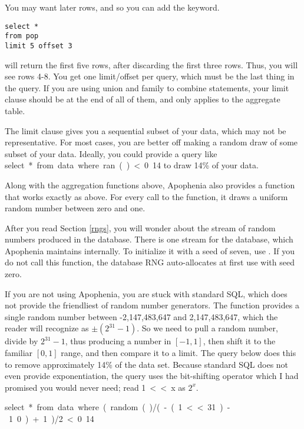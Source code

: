 You may want later rows, and so you can add the  keyword.
\begin{lstlisting}
select * 
from pop
limit 5 offset 3
\end{lstlisting}
will return the first five rows, after discarding the first three rows.
Thus, you will see rows 4-8. You get one \si{limit}/\si{offset} per
query, which must be the last thing in the query. If you are using \si{union}
and family to combine  statements, your \si{limit} clause
should be at the end of all of them, and only applies to the aggregate
table.

The \si{limit} clause gives you a sequential subset of your data, which
may not be representative. For most cases, you are better off making a
random draw of some subset of your data. Ideally, you could provide a
query like \si{select * from data where ran() < 0.14} to draw 14\% of
your data.

Along with the aggregation functions above, Apophenia also provides a
 function that works exactly as above. For every call to the
function, it draws  a uniform random number between zero and one.

After you read Section \ref{rngs}, you will wonder about the stream of
random numbers produced in the database. There is one stream for the
database, which Apophenia maintains internally. To initialize it with
a seed of seven, use . If you do not
call this function, the database RNG auto-allocates at first use with
seed zero.

If you are not using Apophenia, you are stuck with standard SQL, which
does not provide the friendliest of random number generators. The
 function provides a single random number between
-2,147,483,647 and 2,147,483,647, which the reader will recognize as
$\pm (2^{31}-1)$. So we need to pull a random number, divide by $2^{31}-1$,
thus producing a number in $[-1,1]$, then shift it to the familiar $[0,1]$
range, and then compare it to a limit. The query below does this to remove
approximately 14\% of the data set. Because standard SQL does not even
provide exponentiation, the query uses the bit-shifting operator
which I had promised you would never need; read \si{1<<x} as $2^x$.

\si{select * from data where (random()/(-(1<<31)-1.0)+1)/2  < 0.14}


